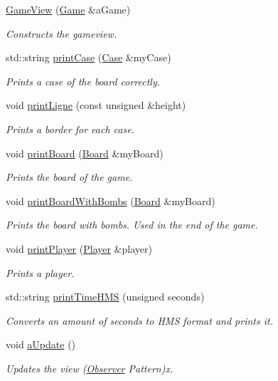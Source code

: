 \begin{DoxyCompactItemize}
\item 
\hyperlink{class_game_view_ac7be63c879c9067ebad04fbccea92ecb}{Game\+View} (\hyperlink{class_game}{Game} \&a\+Game)
\begin{DoxyCompactList}\small\item\em Constructs the gameview. \end{DoxyCompactList}\item 
std\+::string \hyperlink{class_game_view_a40206044e0f9c6b5a8f679400666436a}{print\+Case} (\hyperlink{class_case}{Case} \&my\+Case)
\begin{DoxyCompactList}\small\item\em Prints a case of the board correctly. \end{DoxyCompactList}\item 
void \hyperlink{class_game_view_a075aedb2174abafec7b6789906fcb277}{print\+Ligne} (const unsigned \&height)
\begin{DoxyCompactList}\small\item\em Prints a border for each case. \end{DoxyCompactList}\item 
void \hyperlink{class_game_view_a6e01d1ee4e79453ef7dad726e883af7a}{print\+Board} (\hyperlink{class_board}{Board} \&my\+Board)
\begin{DoxyCompactList}\small\item\em Prints the board of the game. \end{DoxyCompactList}\item 
void \hyperlink{class_game_view_a49a3340e0710fdaa7ae7a24711639427}{print\+Board\+With\+Bombs} (\hyperlink{class_board}{Board} \&my\+Board)
\begin{DoxyCompactList}\small\item\em Prints the board with bombs. Used in the end of the game. \end{DoxyCompactList}\item 
void \hyperlink{class_game_view_adf8a4163d1c1d57b320d8581d4065d13}{print\+Player} (\hyperlink{class_player}{Player} \&player)
\begin{DoxyCompactList}\small\item\em Prints a player. \end{DoxyCompactList}\item 
std\+::string \hyperlink{class_game_view_ab66a806d28193eacb94ac3aee388c8dd}{print\+Time\+H\+MS} (unsigned seconds)
\begin{DoxyCompactList}\small\item\em Converts an amount of seconds to H\+MS format and prints it. \end{DoxyCompactList}\item 
\mbox{\label{class_game_view_ac695e103d61d4411b2be9d7d31a8721d}} 
void \hyperlink{class_game_view_ac695e103d61d4411b2be9d7d31a8721d}{a\+Update} ()
\begin{DoxyCompactList}\small\item\em Updates the view (\hyperlink{class_observer}{Observer} Pattern)x. \end{DoxyCompactList}\end{DoxyCompactItemize}


